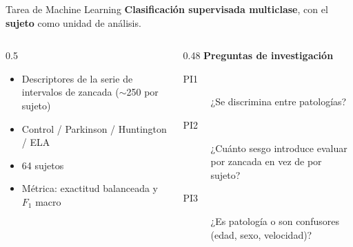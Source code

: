\documentclass[aspectratio=169,10pt]{beamer}
\begin{document}
\begin{frame}{Tarea de Machine Learning}
  \textbf{Clasificación supervisada multiclase}, con el \textbf{sujeto} como unidad de análisis.

  \vspace{1em}
  \begin{columns}[T]
    \begin{column}{0.5\textwidth}
      \begin{itemize}
        \item[\textbf{X}] Descriptores de la serie de intervalos de zancada ($\sim$250 por sujeto)
        \item[\textbf{y}] Control / Parkinson / Huntington / ELA
        \item[\textbf{n}] 64 sujetos
        \item[] Métrica: exactitud balanceada y $F_1$ macro
      \end{itemize}
    \end{column}
    \begin{column}{0.48\textwidth}
      \textbf{Preguntas de investigación}
      \vspace{0.5em}
      \begin{description}
        \item[PI1] ¿Se discrimina entre patologías?
        \item[PI2] ¿Cuánto sesgo introduce evaluar por zancada en vez de por sujeto?
        \item[PI3] ¿Es patología o son confusores (edad, sexo, velocidad)?
      \end{description}
    \end{column}
  \end{columns}
\end{frame}
\end{document}
